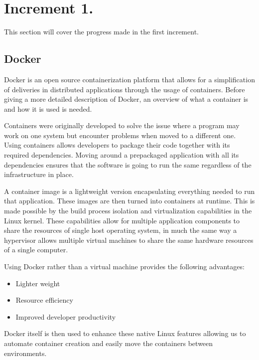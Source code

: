 \section{Increment 1.}
This section will cover the progress made in the first increment. 


\subsection{Docker}
Docker is an open source containerization platform that allows for a simplification of deliveries in distributed applications through the usage of containers. 
Before giving a more detailed description of Docker, an overview of what a container is and how it is used is needed. 


Containers were originally developed to solve the issue where a program may work on one system but encounter problems when moved to a different one. 
Using containers allows developers to package their code together with its required dependencies. 
Moving around a prepackaged application with all its dependencies ensures that the software is going to run the same regardless of the infrastructure in place. 


A container image is a lightweight version encapsulating everything needed to run that application. These images are then turned into containers at runtime. 
This is made possible by the build process isolation and virtualization capabilities in the Linux kernel. 
These capabilities allow for multiple application components to share the resources of single host operating system, 
in much the same way a hypervisor allows multiple virtual machines to share the same hardware resources of a single computer. 


Using Docker rather than a virtual machine provides the following advantages:

\begin{itemize}
    \item Lighter weight
    \item Resource efficiency
    \item Improved developer productivity
\end{itemize}

Docker itself is then used to enhance these native Linux features allowing us to automate container creation and easily move the containers between environments.

